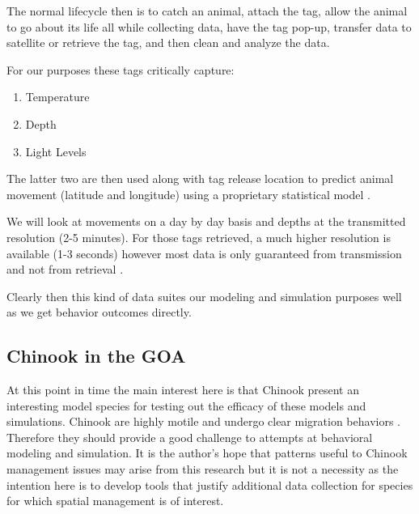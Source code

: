\documentclass[11pt]{article}
\begin{document}
The normal lifecycle then is to catch an animal, attach the tag, allow the animal to go about its life all while collecting data, have the tag pop-up, transfer data to satellite or retrieve the tag, and then clean and analyze the data. \newline

For our purposes these tags critically capture:

\begin{enumerate}
\item Temperature
\item Depth
\item Light Levels
\end{enumerate}

The latter two are then used along with tag release location to predict animal movement (latitude and longitude) using a proprietary statistical model \cite{PSAT}. 

We will look at movements on a day by day basis and depths at the transmitted resolution (2-5 minutes). For those tags retrieved, a much higher resolution is available (1-3 seconds) however most data is only guaranteed from transmission and not from retrieval \cite{PSAT}. 
\newline

Clearly then this kind of data suites our modeling and simulation purposes well as we get behavior outcomes directly. 

\subsection{Chinook in the GOA}

At this point in time the main interest here is that Chinook present an interesting model species for testing out the efficacy of these models and simulations. Chinook are highly motile and undergo clear migration behaviors \cite{tucker2019} \cite{langan2024}. Therefore they should provide a good challenge to attempts at behavioral modeling and simulation. It is the author's hope that patterns useful to Chinook management issues may arise from this research but it is not a necessity as the intention here is to develop tools that justify additional data collection for species for which spatial management is of interest. 
\end{document}
